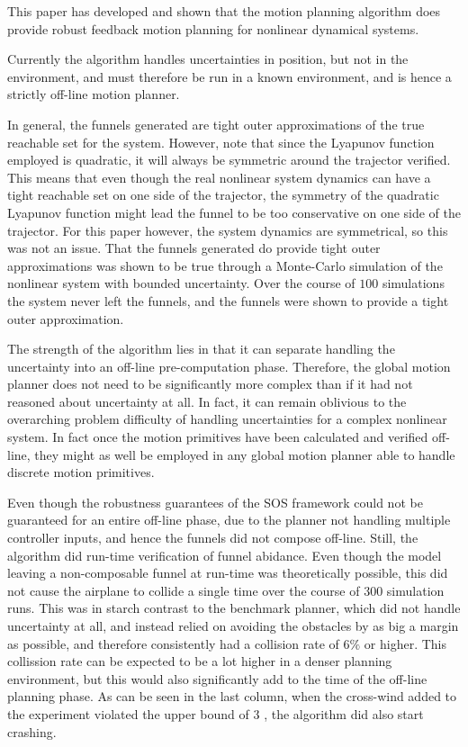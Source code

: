 
This paper has developed and shown that the \rrtfunnel{} motion planning
algorithm does provide robust feedback motion planning for nonlinear dynamical
systems.

Currently the algorithm handles uncertainties in position, but not in the
environment, and must therefore be run in a known environment, and is hence a
strictly off-line motion planner.

In general, the funnels generated are tight outer approximations of the true
reachable set for the system. However, note that since the Lyapunov function
employed is quadratic, it will always be symmetric around the trajector
verified. This means that even though the real nonlinear system dynamics can
have a tight reachable set on one side of the trajector, the symmetry of the
quadratic Lyapunov function might lead the funnel to be too conservative on one
side of the trajector. For this paper however, the system dynamics are
symmetrical, so this was not an issue. That the funnels generated do provide
tight outer approximations was shown to be true through a Monte-Carlo simulation
of the nonlinear system with bounded uncertainty. Over the course of \(100\)
simulations the system never left the funnels, and the funnels were shown to
provide a tight outer approximation.


The strength of the algorithm lies in that it can separate handling the
uncertainty into an off-line pre-computation phase. Therefore, the global motion
planner does not need to be significantly more complex than if it had not
reasoned about uncertainty at all. In fact, it can remain oblivious to the
overarching problem difficulty of handling uncertainties for a complex nonlinear
system. In fact once the motion primitives have been calculated and verified
off-line, they might as well be employed in any global motion planner able to
handle discrete motion primitives.


Even though the robustness guarantees of the SOS framework could not be
guaranteed for an entire off-line phase, due to the planner not handling
multiple controller inputs, and hence the funnels did not compose off-line.
Still, the \rrtfunnel{} algorithm did run-time verification of funnel abidance.
Even though the model leaving a non-composable funnel at run-time was
theoretically possible, this did not cause the airplane to collide a single time
over the course of \(300\) simulation runs. This was in starch contrast to the
benchmark planner, which did not handle uncertainty at all, and instead relied
on avoiding the obstacles by as big a margin as possible, and therefore
consistently had a collision rate of \(6\%\) or higher. This collission rate can
be expected to be a lot higher in a denser planning environment, but this would
also significantly add to the time of the off-line planning phase. As can be
seen in the last column, when the cross-wind added to the experiment violated
the upper bound of \(3\) , the \rrtfunnel{} algorithm did also
start crashing.
